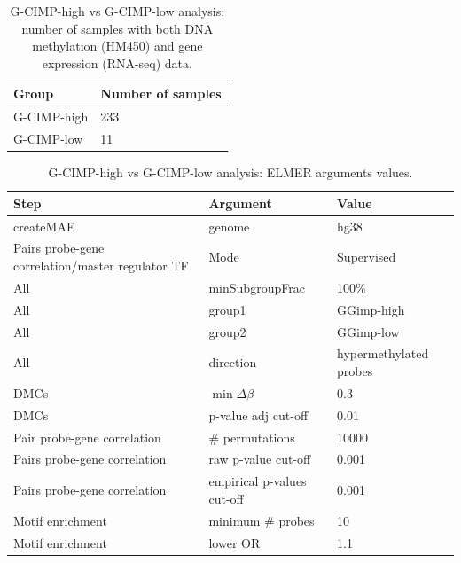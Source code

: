 \begin{table}[h!]
\centering
\caption[G-CIMP analysis: Sample summary]{G-CIMP-high vs G-CIMP-low analysis: number of samples with both DNA methylation (HM450) and gene expression (RNA-seq) data.}
\label{gcimp.samples}
\begin{tabular}{@{}ll@{}}
\toprule
Group       & Number of samples \\ \midrule
G-CIMP-high & 233               \\
G-CIMP-low  & 11
\end{tabular}
\end{table}
\begin{table}[h!]
\centering
\caption[G-CIMP analysis: ELMER arguments values]{G-CIMP-high vs G-CIMP-low analysis: ELMER arguments values.}
\label{gcip.elmer.arg}
\begin{tabular}{@{}lll@{}}
\toprule
Step                        & Argument                           & Value  \\ \midrule
createMAE           & genome &  hg38   \\
Pairs probe-gene correlation/master regulator TF             & Mode &  Supervised   \\
All                         & minSubgroupFrac                    & 100\%  \\
All                         & group1                    & GGimp-high  \\
All                         & group2                    & GGimp-low  \\
All                         & direction                    & hypermethylated probes  \\
DMCs & $\min\Delta\overline{\beta}$                & 0.3    \\
DMCs & p-value adj cut-off                & 0.01   \\
Pair probe-gene correlation           & \# permutations                    & 10000  \\
Pairs  probe-gene correlation           & raw p-value cut-off                & 0.001 \\
Pairs  probe-gene correlation           & empirical p-values cut-off         & 0.001 \\
Motif enrichment            & minimum \# probes  & 10     \\
Motif enrichment            & lower OR                           & 1.1    \\ \bottomrule
\end{tabular}
\end{table}

